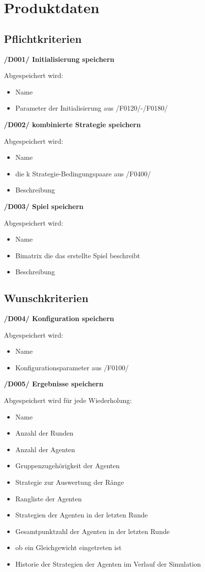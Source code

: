 \section{Produktdaten}

\subsection{Pflichtkriterien}

\textbf{/D001/ Initialisierung speichern}

Abgespeichert wird:
\begin{itemize}
\item Name
\item Parameter der Initialisierung aus /F0120/-/F0180/
\end{itemize}

\textbf{/D002/ kombinierte Strategie speichern}

Abgespeichert wird:
\begin{itemize}
\item Name
\item die k Strategie-Bedingungspaare aus /F0400/ 
\item Beschreibung
\end{itemize}

\textbf{/D003/ Spiel speichern}

Abgespeichert wird:
\begin{itemize}
\item Name 
\item Bimatrix die das erstellte Spiel beschreibt
\item Beschreibung
\end{itemize}

\subsection{Wunschkriterien}

\textbf{/D004/ Konfiguration speichern}

Abgespeichert wird:
\begin{itemize}
\item Name
\item Konfigurationsparameter aus /F0100/
\end{itemize}

\textbf{/D005/ Ergebnisse speichern}	

Abgespeichert wird für jede Wiederholung:
\begin{itemize}
\item Name
\item Anzahl der Runden
\item Anzahl der Agenten
\item Gruppenzugehörigkeit der Agenten
\item Strategie zur Auswertung der Ränge
\item Rangliste der Agenten
\item Strategien der Agenten in der letzten Runde
\item Gesamtpunktzahl der Agenten in der letzten Runde
\item ob ein Gleichgewicht eingetreten ist
\item Historie der Strategien der Agenten im Verlauf der Simulation
\end{itemize}